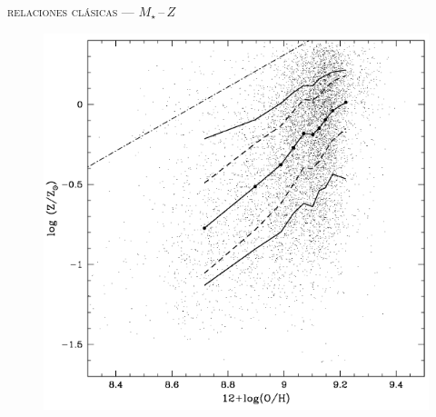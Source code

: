\documentclass[xcolor=dvipsnames,4pt,hyperref={colorlinks,citecolor=black,linkcolor=black,urlcolor=black}]{beamer}
\begin{document}
\begin{frame}{\textsc{relaciones clásicas --- $M_\star\,$--$\,Z$}}
\begin{figure}
\includegraphics[scale=1]{img/gallazzi2005-9}
\end{figure}

\end{frame}
\end{document}
